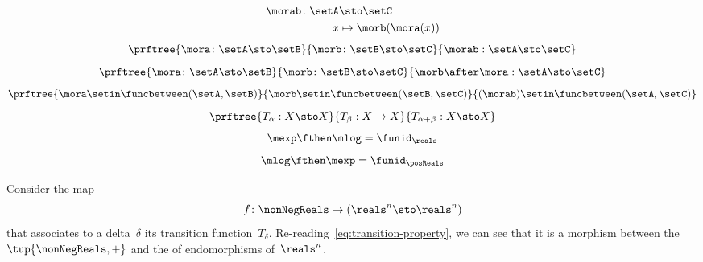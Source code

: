 {\begin{forslides}
        \begin{equation}
            \label{eq:funcomposition}
            \begin{aligned}
                \morab \colon \setA & \sto  \setC \\
                x                   & \mapsto \morb(\mora(x))
            \end{aligned}
        \end{equation}
        \begin{equation}
            \label{eq:funccomp1}
            \prftree{\mora \colon \setA \sto \setB}{\morb \colon \setB \sto \setC}{\morab : \setA \sto \setC}
        \end{equation}
        \begin{equation}
            \label{eq:funccomp2}
            \prftree{\mora \colon \setA \sto \setB}{\morb \colon \setB \sto \setC}{\morb \after \mora : \setA \sto \setC}
        \end{equation}
        \begin{equation}
            \label{eq:funccomp3}
            \prftree{%
                \mora \setin \funcbetween(\setA, \setB)}{%
                \morb \setin \funcbetween( \setB, \setC)}{
                (\morab) \setin \funcbetween( \setA, \setC)}
        \end{equation}
        \begin{equation}
            \label{eq:transitions}
            \prftree{T_\alpha: X \sto X }{T_\beta : X \to X}{T_{\alpha+\beta} : X \sto X}
        \end{equation}
        \begin{equation}
            \label{eq:explogid}
            \mexp \fthen \mlog = \funid_{\reals}
        \end{equation}
        \begin{equation}
            \label{eq:logexpid}
            \mlog \fthen \mexp = \funid_{\posReals}
        \end{equation}
    \end{forslides}
}%

\begin{example}
    Consider the map
    \begin{equation}
        f\colon \nonNegReals \to (\reals^n \sto \reals^n)
    \end{equation}
    that associates to a delta~$\delta$ its transition function~$T_\delta$.
    Re-reading~\cref{eq:transition-property}, we can see that it is a morphism between the ~$\tup{\nonNegReals,+}$ and the  of endomorphisms of~$\reals^n$.
\end{example}


